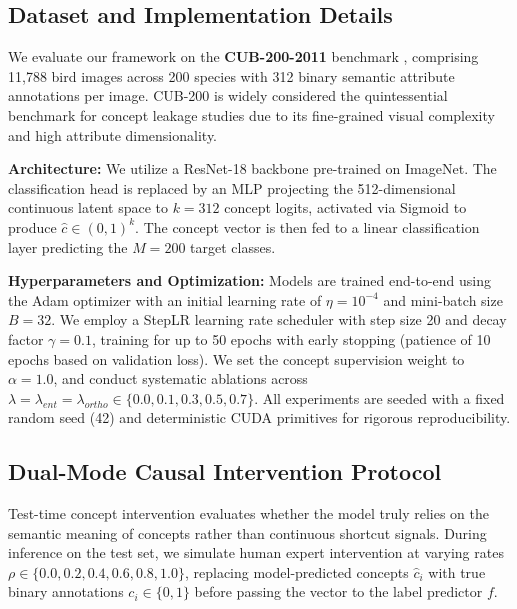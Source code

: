 \documentclass[times,twocolumn,final]{elsarticle}
\begin{document}
\subsection{Dataset and Implementation Details}
We evaluate our framework on the \textbf{CUB-200-2011} benchmark \citep{wah2011caltech}, comprising 11,788 bird images across 200 species with 312 binary semantic attribute annotations per image. CUB-200 is widely considered the quintessential benchmark for concept leakage studies due to its fine-grained visual complexity and high attribute dimensionality.

\noindent\textbf{Architecture:} We utilize a ResNet-18 backbone pre-trained on ImageNet. The classification head is replaced by an MLP projecting the 512-dimensional continuous latent space to $k=312$ concept logits, activated via Sigmoid to produce $\hat{c} \in (0, 1)^k$. The concept vector is then fed to a linear classification layer predicting the $M=200$ target classes.

\noindent\textbf{Hyperparameters and Optimization:} 
Models are trained end-to-end using the Adam optimizer with an initial learning rate of $\eta = 10^{-4}$ and mini-batch size $B = 32$. We employ a StepLR learning rate scheduler with step size 20 and decay factor $\gamma = 0.1$, training for up to 50 epochs with early stopping (patience of 10 epochs based on validation loss). We set the concept supervision weight to $\alpha = 1.0$, and conduct systematic ablations across $\lambda = \lambda_{ent} = \lambda_{ortho} \in \{0.0, 0.1, 0.3, 0.5, 0.7\}$. All experiments are seeded with a fixed random seed (42) and deterministic CUDA primitives for rigorous reproducibility.

\subsection{Dual-Mode Causal Intervention Protocol}
Test-time concept intervention evaluates whether the model truly relies on the semantic meaning of concepts rather than continuous shortcut signals. During inference on the test set, we simulate human expert intervention at varying rates $\rho \in \{0.0, 0.2, 0.4, 0.6, 0.8, 1.0\}$, replacing model-predicted concepts $\hat{c}_i$ with true binary annotations $c_i \in \{0, 1\}$ before passing the vector to the label predictor $f$.
\end{document}
